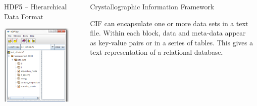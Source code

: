 \documentclass[final]{beamer}
\begin{document}
\begin{frame}{}
\begin{columns}[t]
\begin{column}{.31\linewidth}
\begin{block}{HDF5 -- Hierarchical Data Format}
         \vspace{6mm}

         \begin{center}
           \includegraphics[width=0.62\linewidth]{hdf5.png}
         \end{center}

         \vspace{10mm} {\ }   \vspace{10mm} {\ }

        \end{block}
      \end{column}
      \begin{column}{.01\linewidth}
      \end{column}
      \begin{column}{.34\linewidth}
        \begin{block}{Crystallographic Information Framework}

          \justifying CIF can encapsulate one or more data sets in a text
          file.  Within each block, data and meta-data appear as key-value
          pairs or in a series of tables.  This gives a text representation
          of a relational database.


\end{block}
\end{column}
\end{columns}
\end{frame}
\end{document}
